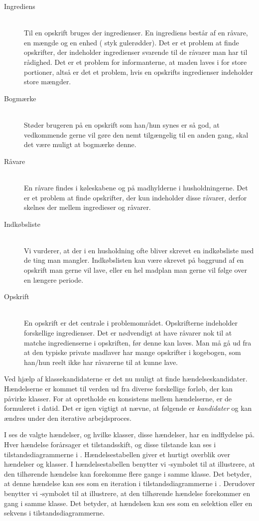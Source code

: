 \begin{description}
\item[Ingrediens] \hfill \\ 
Til en opskrift bruges der ingredienser. En ingrediens består af en råvare, en mængde og en enhed ( styk gulerødder). Det er et problem at finde opskrifter, der indeholder ingredienser svarende til de råvarer man har til rådighed. Det er et problem for informanterne, at maden laves i for store portioner, altså er det et problem, hvis en opskrifts ingredienser indeholder store mængder.

\item[Bogmærke] \hfill \\
Støder brugeren på en opskrift som han/hun synes er så god, at vedkommende gerne vil gøre den nemt tilgængelig til en anden gang, skal det være muligt at bogmærke denne. 

\item[Råvare] \hfill \\
En råvare findes i køleskabene og på madhylderne i husholdningerne. Det er et problem at finde opskrifter, der kun indeholder disse råvarer, derfor skelnes der mellem ingredieser og råvarer.

\item[Indkøbsliste] \hfill \\
Vi vurderer, at der i en husholdning ofte bliver skrevet en indkøbsliste med de ting man mangler. Indkøbslisten kan være skrevet på baggrund af en opskrift man gerne vil lave, eller en hel madplan man gerne vil følge over en længere periode.

\item[Opskrift] \hfill \\
En opskrift er det centrale i problemområdet. Opskrifterne indeholder forskellige ingredienser. Det er nødvendigt at have råvarer nok til at matche ingredienserne i opskriften, før denne kan laves. Man må gå ud fra at den typiske private madlaver har mange opskrifter i kogebogen, som han/hun reelt ikke har råvarerne til at kunne lave.
\end{description}

Ved hjælp af klassekandidaterne er det nu muligt at finde hændelseskandidater. Hændelserne er kommet til verden ud fra diverse forskellige forløb, der kan påvirke klasser. For at opretholde en konsistens mellem hændelserne, er de formuleret i datid. Det er igen vigtigt at nævne, at følgende er \emph{kandidater} og kan ændres under den iterative arbejdsproces. 

I  ses de valgte hændelser, og hvilke klasser, disse hændelser, har en indflydelse på. Hver hændelse forårsager et tilstandsskift, og disse tilstande kan ses i tilstandsdiagrammerne i . Hændelsestabellen giver et hurtigt overblik over hændelser og klasser. I hændelsestabellen benytter vi \iter-symbolet til at illustrere, at den tilhørende hændelse kan forekomme flere gange i samme klasse. Det betyder, at denne hændelse kan ses som en iteration i tilstandsdiagrammerne i . Derudover benytter vi \once-symbolet til at illustrere, at den tilhørende hændelse forekommer en gang i samme klasse. Det betyder, at hændelsen kan ses som en selektion eller en sekvens i tilstandsdiagrammerne.

